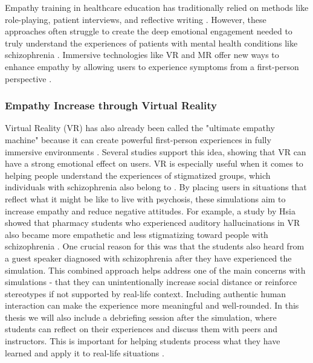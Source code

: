 Empathy training in healthcare education has traditionally relied on methods like role-playing, patient interviews, and reflective writing \cite{Batt-Rawden2013}. However, these approaches often struggle to create the deep emotional engagement needed to truly understand the experiences of patients with mental health conditions like schizophrenia \cite{Hsia2022, Formosa2018}. Immersive technologies like VR and MR offer new ways to enhance empathy by allowing users to experience symptoms from a first-person perspective \cite{Krogmeier2024, Silva2017}.

\subsubsection{Empathy Increase through Virtual Reality}

Virtual Reality (VR) has also already been called the "ultimate empathy machine" because it can create powerful first-person experiences in fully immersive environments \cite{Milk2015}. Several studies support this idea, showing that VR can have a strong emotional effect on users. VR is especially useful when it comes to helping people understand the experiences of stigmatized groups, which individuals with schizophrenia also belong to \cite{Formosa2018, Marques2022, Mattsson2024}. By placing users in situations that reflect what it might be like to live with psychosis, these simulations aim to increase empathy and reduce negative attitudes. For example, a study by Hsia \cite{Hsia2022} showed that pharmacy students who experienced auditory hallucinations in VR also became more empathetic and less stigmatizing toward people with schizophrenia \cite{Hsia2022}. One crucial reason for this was that the students also heard from a guest speaker diagnosed with schizophrenia after they have experienced the simulation. This combined approach helps address one of the main concerns with simulations - that they can unintentionally increase social distance or reinforce stereotypes if not supported by real-life context. Including authentic human interaction can make the experience more meaningful and well-rounded. In this thesis we will also include a debriefing session after the simulation, where students can reflect on their experiences and discuss them with peers and instructors. This is important for helping students process what they have learned and apply it to real-life situations \cite{Hsia2022}.

\vspace{1em}

